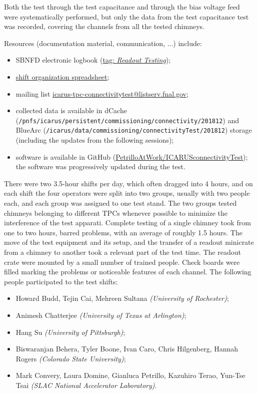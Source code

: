 Both the test through the test capacitance and through the bias voltage feed
were systematically performed, but only the data from the test capacitance test
was recorded, covering the channels from all the tested chimneys.

Resources (documentation material, communication, ...) include:
\begin{itemize}
  \item SBNFD electronic logbook (\href{http://dbweb6.fnal.gov:8080/ECL/sbnfd/E/search?id=&id_from=&id_to=&t_after=12\%2F01\%2F2018&t_before=12\%2F24\%2F2018&tag\%3AReadout+Testing=on&action=Search}{tag: \emph{Readout Testing}});
  \item \href{https://docs.google.com/spreadsheets/d/1zR-Ytg8CJ5gw-f--yKqr1PXTCiJ0MirVgbQ_ybcFCKM/edit?usp=sharing}{shift organization spreadsheet};
  \item mailing list \href{https://listserv.fnal.gov/scripts/wa.exe?A0=ICARUS-TPC-CONNECTIVITYTEST}{icarus-tpc-connectivitytest@listserv.fnal.gov};
  \item collected data is available in dCache
    ({\small\texttt{/pnfs/icarus/persistent/commissioning/connectivity/201812}})
    and BlueArc
    ({\small\texttt{/icarus/data/commissioning/connectivityTest/201812}}) storage
    (including the updates from the following sessions);
  \item software is available in GitHub
    (\href{https://github.com/PetrilloAtWork/ICARUSconnectivityTest}{PetrilloAtWork/ICARUSconnectivityTest}); the software was progressively updated during the test.
\end{itemize}

There were two 3.5-hour shifts per day, which often dragged into 4 hours, and
on each shift the four operators were split into two groups, usually with
two people each, and each group was assigned to one test stand.
The two groups tested chimneys belonging to different TPCs whenever possible to
minimize the interference of the test apparati.
Complete testing of a single chimney took from one to two hours, barred
problems, with an average of roughly 1.5 hours. The move of the test equipment
and its setup, and the transfer of a readout minicrate from a chimney to another
took a relevant part of the test time. The readout crate were mounted by
a small number of trained people.
Check boards were filled marking the problems or noticeable features of each
channel.
The following people participated to the test shifts:
\begin{itemize}
  \item Howard Budd, Tejin Cai, Mehreen Sultana \emph{(University of Rochester)};
  \item Animesh Chatterjee \emph{(University of Texas at Arlington)};
  \item Hang Su \emph{(University of Pittsburgh)};
  \item Biswaranjan Behera, Tyler Boone, Ivan Caro, Chris Hilgenberg, Hannah Rogers \emph{(Colorado State University)};
  \item Mark Convery, Laura Domine, Gianluca Petrillo, Kazuhiro Terao, Yun-Tse Tsai \emph{(SLAC National Accelerator Laboratory)}.
\end{itemize}



